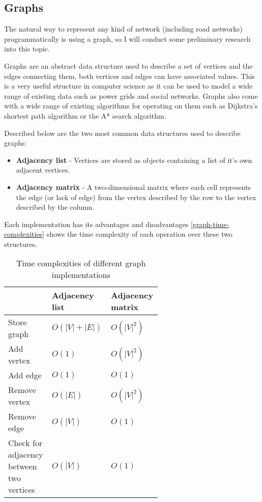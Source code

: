     \subsection{Graphs}
    \label{max-flow}

        The natural way to represent any kind of network (including road networks) programmatically is using a graph, so I will conduct some preliminary research into this topic.

        Graphs are an abstract data structure used to describe a set of vertices and the edges connecting them, both vertices and edges can have associated values. This is a very useful structure in computer science as it can be used to model a wide range of existing data such as power grids and social networks. Graphs also come with a wide range of existing algorithms for operating on them such as Dijkstra's shortest path algorithm or the A* search algorithm.

        Described below are the two most common data structures used to describe graphs:

        \begin{itemize}
            \item \textbf{Adjacency list} - Vertices are stored as objects containing a list of it's own adjacent vertices.
            \item \textbf{Adjacency matrix} - A two-dimensional matrix where each cell represents the edge (or lack of edge) from the vertex described by the row to the vertex described by the column.
        \end{itemize}

        Each implementation has its advantages and disadvantages \autoref{graph-time-complexities} shows the time complexity of each operation over these two structures.


        \begin{table}[ht]
            \centering
            \begin{tabular}{|p{0.2\linewidth}|p{0.2\linewidth}|p{0.2\linewidth}|} \hline
            & Adjacency list & Adjacency matrix \\ \hline
            Store graph   & $O(|V|+|E|)$ & $O(|V|^2)$ \\ \hline
            Add vertex    & $O(1)$ & $O(|V|^2)$ \\ \hline
            Add edge      & $O(1)$ & $O(1)$ \\ \hline
            Remove vertex & $O(|E|)$ & $O(|V|^2)$ \\ \hline
            Remove edge   & $O(|V|)$ & $O(1)$ \\ \hline
            Check for adjacency between two vertices & $O(|V|)$ & $O(1)$ \\ \hline
            \end{tabular}
            \caption{Time complexities of different graph implementations \cite{graph-time-complexities}}
            \label{graph-time-complexities}
        \end{table}

